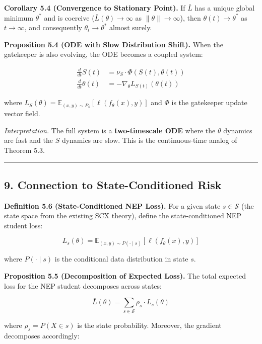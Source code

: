 \documentclass[
  12pt,
]{article}
\begin{document}
\textbf{Corollary 5.4 (Convergence to Stationary Point).} If \(\bar{L}\)
has a unique global minimum \(\theta^*\) and is coercive
(\(\bar{L}(\theta) \to \infty\) as \(\|\theta\| \to \infty\)), then
\(\theta(t) \to \theta^*\) as \(t \to \infty\), and consequently
\(\theta_t \to \theta^*\) almost surely.

\textbf{Proposition 5.4 (ODE with Slow Distribution Shift).} When the
gatekeeper is also evolving, the ODE becomes a coupled system:

\[
\begin{aligned}
\frac{d}{dt} S(t) &= \nu_S \cdot \Phi(S(t), \theta(t)) \\
\frac{d}{dt} \theta(t) &= -\nabla_\theta L_{S(t)}(\theta(t))
\end{aligned}
\]

where
\(L_S(\theta) = \mathbb{E}_{(x,y) \sim P_S}[\ell(f_\theta(x), y)]\) and
\(\Phi\) is the gatekeeper update vector field.

\emph{Interpretation.} The full system is a \textbf{two-timescale ODE}
where the \(\theta\) dynamics are fast and the \(S\) dynamics are slow.
This is the continuous-time analog of Theorem 5.3.

\begin{center}\rule{0.5\linewidth}{0.5pt}\end{center}

\subsection{9. Connection to State-Conditioned
Risk}\label{connection-to-state-conditioned-risk}

\textbf{Definition 5.6 (State-Conditioned NEP Loss).} For a given state
\(s \in \mathcal{S}\) (the state space from the existing SCX theory),
define the state-conditioned NEP student loss:

\[
L_s(\theta) = \mathbb{E}_{(x,y) \sim P(\cdot \mid s)}[\ell(f_\theta(x), y)]
\]

where \(P(\cdot \mid s)\) is the conditional data distribution in state
\(s\).

\textbf{Proposition 5.5 (Decomposition of Expected Loss).} The total
expected loss for the NEP student decomposes across states:

\[
\bar{L}(\theta) = \sum_{s \in \mathcal{S}} \rho_s \cdot L_s(\theta)
\]

where \(\rho_s = P(X \in s)\) is the state probability. Moreover, the
gradient decomposes accordingly:
\end{document}
